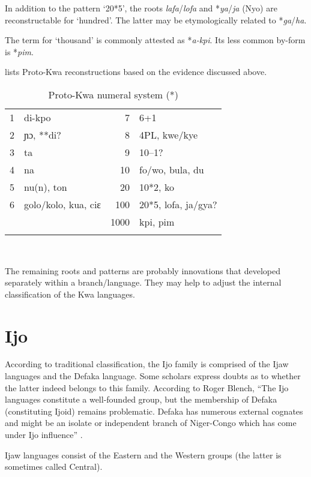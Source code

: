 In addition to the pattern ‘20*5’, the roots \textit{lafa}/\textit{lofa} and *\textit{ya}/\textit{ja} (Nyo) are reconstructable for ‘hundred’. The latter may be etymologically related to *\textit{ga}/\textit{ha}.

The term for ‘thousand’ is commonly attested as *\textit{a-kpi}. Its less common by-form is *\textit{pim}.

\newpage 
\largerpage
{} lists  Proto-Kwa reconstructions based on the evidence discussed above.

\begin{table}[b!]
\caption{\label{tab:3:89}Proto-Kwa numeral system (*)}
\begin{tabularx}{\textwidth}{lXrl}
\lsptoprule
{1} & di-kpo & {7} & 6+1\\
{2} & ɲɔ, **di? & {8} & 4PL, kwe/kye\\
{3} & ta & {9} & 10--1?\\
{4} & na & {10} & fo/wo, bula, du\\
{5} & nu(n), ton & {20} & 10*2, ko\\
{6} & golo/kolo, kua, ciɛ & {100} & 20*5, lofa, ja/gya?\\
&  & {1000} & kpi, pim\\
\lspbottomrule
\end{tabularx}\\
\raggedright\footnotesize
The remaining roots and patterns are probably innovations that developed separately within a branch/language. They may help to adjust the internal classification of the Kwa languages. 
\end{table}

 
\clearpage  
\section{Ijo}%

According to traditional classification, the Ijo family is comprised of the Ijaw languages and the Defaka language. Some scholars express doubts as to whether the latter indeed belongs to this family. According to Roger Blench, ``The Ijo languages constitute a well-founded group, but the membership of Defaka (constituting Ijoid) remains problematic. Defaka has numerous external cognates and might be an isolate or independent branch of Niger-Congo which has come under Ijo influence''  \citep{Blench1993NigerCongo}. 

Ijaw languages consist of the Eastern and the Western groups (the latter is sometimes called Central). 

